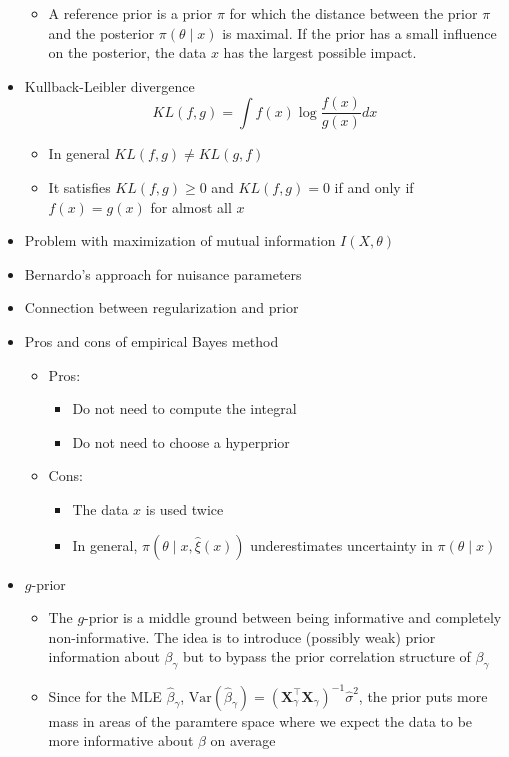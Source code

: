 \documentclass[a4paper]{article}
\begin{document}
\begin{itemize}
\begin{itemize}
        \item A reference prior is a prior $\pi$ for which the distance between the prior $\pi$ and the posterior $\pi(\theta\mid x)$ is maximal. If the prior has a small influence on the posterior, the data $x$ has the largest possible impact.
    \end{itemize}
    \item Kullback-Leibler divergence
    \[KL(f,g)=\int f(x)\log\frac{f(x)}{g(x)}dx \]
    \begin{itemize}
        \item In general $KL(f,g)\neq KL(g,f)$
        \item It satisfies $KL(f,g)\geq 0$ and $KL(f,g)=0$ if and only if $f(x)=g(x)$ for almost all $x$
    \end{itemize}
    \item Problem with maximization of mutual information $I(X,\theta)$
    \item Bernardo's approach for nuisance parameters
    \item Connection between regularization and prior
    \item Pros and cons of empirical Bayes method
    \begin{itemize}
        \item Pros:
        \begin{itemize}
            \item Do not need to compute the integral
            \item Do not need to choose a hyperprior
        \end{itemize}
        \item Cons:
        \begin{itemize}
            \item The data $x$ is used twice
            \item In general, $\pi(\theta\mid x,\widehat{\xi}(x))$ underestimates uncertainty in $\pi(\theta\mid x)$
        \end{itemize}
    \end{itemize}
    \item $g$-prior
    \begin{itemize}
        \item The $g$-prior is a middle ground between being informative and completely non-informative. The idea is to introduce (possibly weak) prior information about $\beta_{\gamma}$ but to bypass the prior correlation structure of $\beta_{\gamma}$
        \item Since for the MLE $\hat{\beta}_{\gamma}$, $\text{Var}(\hat{\beta}_{\gamma})=(\mathbf{X}_{\gamma}^{\intercal}\mathbf{X}_{\gamma})^{-1}\hat{\sigma}^2$, the prior puts more mass in areas of the paramtere space where we expect the data to be more informative about $\beta$ on average

\end{itemize}
\end{itemize}
\end{document}
